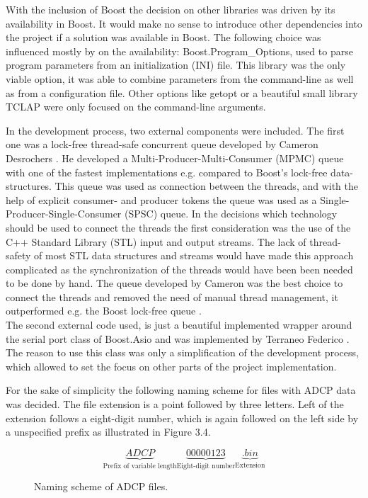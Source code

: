 With the inclusion of Boost the decision on other libraries was driven by its availability in Boost. It would make no sense to introduce other dependencies into the project if a solution was available in Boost. The following choice was influenced mostly by on the availability: Boost.Program\_Options, used to parse program parameters from an initialization (INI) file. This library was the only viable option, it was able to combine parameters from the command-line as well as from a configuration file. Other options like getopt \cite{getop} or a beautiful small library TCLAP \cite{tclap} were only focused on the command-line arguments. 

In the development process, two external components were included. The first one was a lock-free thread-safe concurrent queue developed by Cameron Desrochers \cite{moody}. He developed a Multi-Producer-Multi-Consumer (MPMC) queue with one of the fastest implementations e.g. compared to Boost's lock-free data-structures. This queue was used as connection between the threads, and with the help of explicit consumer- and producer tokens the queue was used as a Single-Producer-Single-Consumer (SPSC) queue. In the decisions which technology should be used to connect the threads the first consideration was the use of the C++ Standard Library (STL) \cite{stl_stream} input and output streams. The lack of thread-safety of most STL data structures and streams would have made this approach complicated as the synchronization of the threads would have been been needed to be done by hand. The queue developed by Cameron was the best choice to connect the threads and removed the need of manual thread management, it outperformed e.g. the Boost lock-free queue \cite{boost_lockfree}.\\
The second external code used, is just a beautiful implemented wrapper around the serial port class of Boost.Asio and was implemented by Terraneo Federico \cite{serport}. The reason to use this class was only a simplification of the development process, which allowed to set the focus on other parts of the project implementation.

For the sake of simplicity the following naming scheme for files with ADCP data was decided. The file extension is a point followed by three letters. Left of the extension follows a eight-digit number, which is again followed on the left side by a unspecified prefix as illustrated in Figure 3.4.
\begin{figure}[!ht]
$$ \underbrace{ADCP}_{\text{Prefix of variable length}}\underbrace{00000123}_{\text{Eight-digit number}}\underbrace{.bin}_{\text{Extension}}$$
        \caption{Naming scheme of ADCP files.}
\end{figure}


